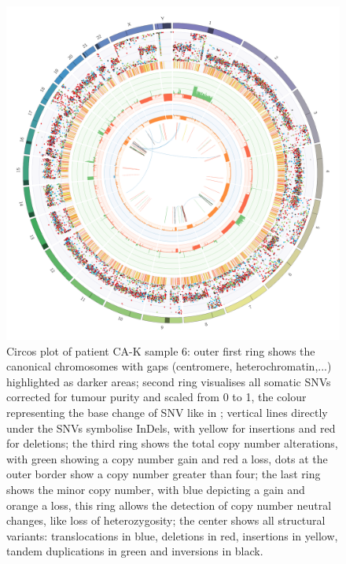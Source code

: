 \begin{figure}[ht]
\centering
\includegraphics[width=.99\linewidth]{Figures/CASCADE/CA82/CA82-6.circos.png}
\caption[Circos plot of patient CA-K sample 6]{Circos plot of patient CA-K sample 6: outer first ring shows the canonical chromosomes with gaps (centromere, heterochromatin,...) highlighted as darker areas; second ring visualises all somatic SNVs corrected for tumour purity and scaled from 0 to 1, the colour representing the base change of SNV like in \protect\textcite{Alexandrov2013}; vertical lines directly under the SNVs symbolise InDels, with yellow for insertions and red for deletions; the third ring shows the total copy number alterations, with green showing a copy number gain and red a loss, dots at the outer border show a copy number greater than four; the last ring shows the minor copy number, with blue depicting a gain and orange a loss, this ring allows the detection of copy number neutral changes, like loss of heterozygosity; the center shows all structural variants: translocations in blue, deletions in red, insertions in yellow, tandem duplications in green and inversions in black.} \label{fig:ca82.6circos}
\end{figure}


